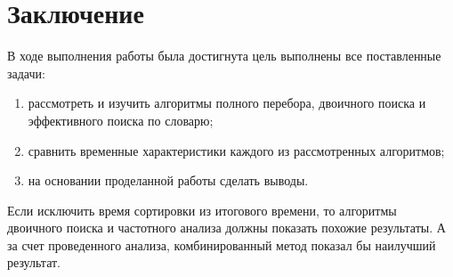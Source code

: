 \documentclass[a4paper, 12pt]{article}
\begin{document}
	\section*{Заключение}
	\hspace*{5mm} В ходе выполнения работы была достигнута цель выполнены все поставленные задачи:
	\begin{enumerate}
		\item рассмотреть и изучить алгоритмы полного перебора, двоичного поиска и эффективного поиска по словарю;
		\item сравнить временные характеристики каждого из рассмотренных алгоритмов;
		\item на основании проделанной работы сделать выводы.
	\end{enumerate}
	\hspace*{5mm} Если исключить время сортировки из итогового времени, то алгоритмы двоичного поиска и частотного анализа должны показать похожие результаты. А за счет проведенного анализа, комбинированный метод показал бы наилучший результат.    
\clearpage
\newpage

\printbibliography
{}
\end{document}
